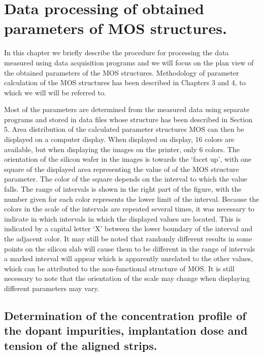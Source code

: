 
\chapter{Data processing of obtained parameters of MOS structures.}\label{Chapter6}

In this chapter we briefly describe the procedure for processing the
data measured using data acquisition programs and we will focus on the
plan view of the obtained parameters of the MOS
structures. Methodology of parameter calculation of the MOS structures
has been described in Chapters 3 and 4, to which we will will be
referred to.

Most of the parameters are determined from the measured data using
separate programs and stored in data files whose structure has been
described in Section 5. Area distribution of the calculated parameter
structures MOS can then be displayed on a computer display. When
displayed on display, 16 colors are available, but when displaying
the images on the printer, only 6 colors. The orientation of the
silicon wafer in the images is towards the `facet up', with one square
of the displayed area representing the value of of the MOS structure
parameter. The color of the square depends on the interval to which
the value falls. The range of intervals is shown in the right part of
the figure, with the number given for each color represents the lower
limit of the interval. Because the colors in the scale of the
intervals are repeated several times, it was necessary to indicate in
which intervals in which the displayed values are located. This is
indicated by a capital letter `X' between the lower boundary of the
interval and the adjacent color. It may still be noted that randomly
different results in some points on the silicon slab will cause them
to be different in the range of intervals a marked interval will
appear which is apparently unrelated to the other values, which can be
attributed to the non-functional structure of MOS\@. It is still
necessary to note that the orientation of the scale may change when
displaying different parameters may vary.

\section{Determination of the concentration profile of the dopant impurities, implantation dose and tension of the aligned strips.}\label{sec:6.1}

